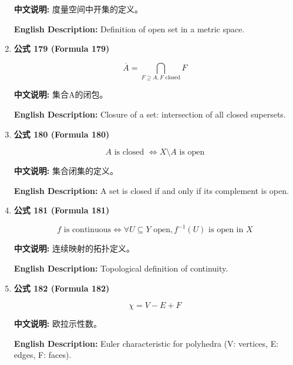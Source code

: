 \documentclass[12pt,a4paper]{article}
\begin{document}
\begin{enumerate}[leftmargin=*]
\textbf{中文说明:} 度量空间中开集的定义。

\textbf{English Description:} Definition of open set in a metric space.

\vspace{0.5cm}

\item \textbf{公式 179 (Formula 179)}

\begin{equation}
\overline{A} = \bigcap_{F \supseteq A, F \text{ closed}} F
\end{equation}

\textbf{中文说明:} 集合A的闭包。

\textbf{English Description:} Closure of a set: intersection of all closed supersets.

\vspace{0.5cm}

\item \textbf{公式 180 (Formula 180)}

\begin{equation}
A \text{ is closed } \iff X \setminus A \text{ is open}
\end{equation}

\textbf{中文说明:} 集合闭集的定义。

\textbf{English Description:} A set is closed if and only if its complement is open.

\vspace{0.5cm}

\item \textbf{公式 181 (Formula 181)}

\begin{equation}
f \text{ is continuous} \iff \forall U \subseteq Y \text{ open}, f^{-1}(U) \text{ is open in } X
\end{equation}

\textbf{中文说明:} 连续映射的拓扑定义。

\textbf{English Description:} Topological definition of continuity.

\vspace{0.5cm}

\item \textbf{公式 182 (Formula 182)}

\begin{equation}
\chi = V - E + F
\end{equation}

\textbf{中文说明:} 欧拉示性数。

\textbf{English Description:} Euler characteristic for polyhedra (V: vertices, E: edges, F: faces).


\end{enumerate}
\end{document}
